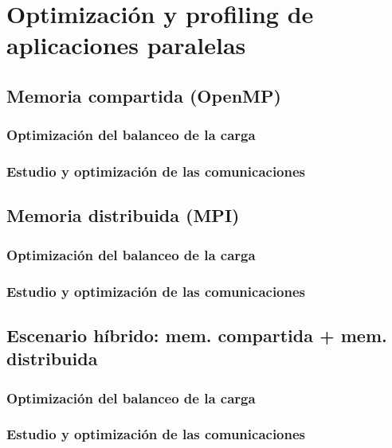 \documentclass[10pt]{beamer}
\begin{document}
\section{Optimización y profiling de aplicaciones paralelas}


\subsection{Memoria compartida (OpenMP)}

\frame{
}

\subsubsection{Optimización del balanceo de la carga}

\frame{
}

\subsubsection{Estudio y optimización de las comunicaciones}

\frame{
}

\subsection{Memoria distribuida (MPI)}

\frame{
}

\subsubsection{Optimización del balanceo de la carga}

\frame{
}

\subsubsection{Estudio y optimización de las comunicaciones}

\frame{
}

\subsection{Escenario híbrido: mem. compartida + mem. distribuida}

\frame{
}

\subsubsection{Optimización del balanceo de la carga}

\frame{
}

\subsubsection{Estudio y optimización de las comunicaciones}

\frame{
}
\end{document}
